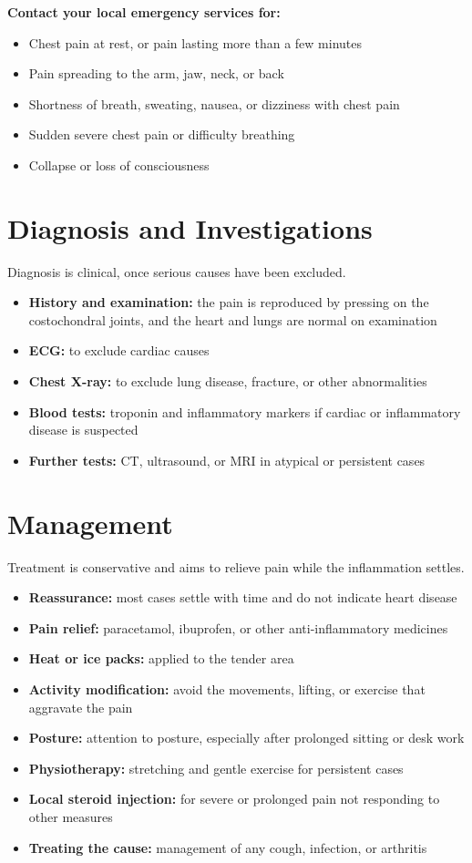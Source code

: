 \textbf{Contact your local emergency services for:}
\begin{itemize}
    \item Chest pain at rest, or pain lasting more than a few minutes
    \item Pain spreading to the arm, jaw, neck, or back
    \item Shortness of breath, sweating, nausea, or dizziness with chest pain
    \item Sudden severe chest pain or difficulty breathing
    \item Collapse or loss of consciousness
\end{itemize}

\section*{Diagnosis and Investigations}
Diagnosis is clinical, once serious causes have been excluded.

\begin{itemize}
    \item \textbf{History and examination:} the pain is reproduced by pressing on the costochondral joints, and the heart and lungs are normal on examination
    \item \textbf{ECG:} to exclude cardiac causes
    \item \textbf{Chest X-ray:} to exclude lung disease, fracture, or other abnormalities
    \item \textbf{Blood tests:} troponin and inflammatory markers if cardiac or inflammatory disease is suspected
    \item \textbf{Further tests:} CT, ultrasound, or MRI in atypical or persistent cases
\end{itemize}

\section*{Management}
Treatment is conservative and aims to relieve pain while the inflammation settles.

\begin{itemize}
    \item \textbf{Reassurance:} most cases settle with time and do not indicate heart disease
    \item \textbf{Pain relief:} paracetamol, ibuprofen, or other anti-inflammatory medicines
    \item \textbf{Heat or ice packs:} applied to the tender area
    \item \textbf{Activity modification:} avoid the movements, lifting, or exercise that aggravate the pain
    \item \textbf{Posture:} attention to posture, especially after prolonged sitting or desk work
    \item \textbf{Physiotherapy:} stretching and gentle exercise for persistent cases
    \item \textbf{Local steroid injection:} for severe or prolonged pain not responding to other measures
    \item \textbf{Treating the cause:} management of any cough, infection, or arthritis
\end{itemize}

